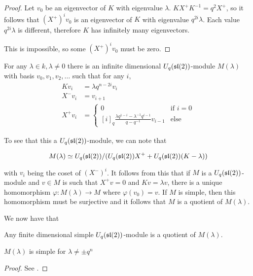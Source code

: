 \begin{proof}
    Let $v_0$ be an eigenvector of $K$ with eigenvalue $\lambda$. $K X^+ K^{-1} =
    q^2  X^+$, so it follows that $(X^+)^i v_0$ is an eigenvector of $K$ with
    eigenvalue $q^{2i}\lambda$. Each value $q^{2i}\lambda$ is different,
    therefore $K$ has infinitely many eigenvectors. 

    This is impossible, so some $(X^+)^i v_0$ must be zero.
\end{proof}

For any $\lambda \in k, \lambda \neq 0$ there is an infinite dimensional
$U_q(\mathfrak{sl}(2))$-module $M(\lambda)$ with basis $v_0, v_1, v_2, \ldots$ such that
for any $i$,
\begin{align}
    Kv_i &= \lambda q^{n-2i}v_i \\
    X^-v_i &= v_{i+1} \\
     X^+ v_i &= \begin{cases} 0 & \text{if $i = 0$} \\
                          [i]_q \frac{\lambda q^{1-i} - \lambda^{-1}q^{i-1}}{q - q^{-1}}v_{i-1} & \text{else}
            \end{cases}
\end{align}

To see that this a $U_q(\mathfrak{sl}(2))$-module, we can note that 

\begin{equation}
    M(\lambda) \simeq U_q(\mathfrak{sl}(2))/(U_q(\mathfrak{sl}(2)) X^+  + U_q(\mathfrak{sl}(2))(K-\lambda))
\end{equation}

with $v_i$ being the coset of $(X^-)^i$. It follows from this that if $M$ is a
$U_q(\mathfrak{sl}(2))$-module and $v \in M$ is such that $X^+ v = 0$ and $Kv = \lambda v$, there
is a unique homomorphism $\varphi: M(\lambda) \to M$ where $\varphi(v_0) = v$.
If $M$ is simple, then this homomorphism must be  surjective and it follows
that $M$ is a quotient of $M(\lambda)$. 

We now have that 
\begin{claim}
    Any finite dimensional simple $U_q(\mathfrak{sl}(2))$-module is a quotient of $M(\lambda)$.
\end{claim}

\begin{claim}
    $M(\lambda)$ is simple for $\lambda \neq \pm q^n$
\end{claim}

\begin{proof}
    See \cite{Jantzen1996}.
\end{proof}

